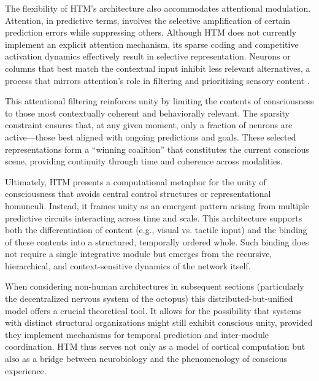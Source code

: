 \documentclass{article}
\begin{document}
The flexibility of HTM’s architecture also accommodates attentional modulation. Attention, in predictive terms, involves the selective amplification of certain prediction errors while suppressing others. Although HTM does not currently implement an explicit attention mechanism, its sparse coding and competitive activation dynamics effectively result in selective representation. Neurons or columns that best match the contextual input inhibit less relevant alternatives, a process that mirrors attention's role in filtering and prioritizing sensory content \parencite{cui2017spatial}.

This attentional filtering reinforces unity by limiting the contents of consciousness to those most contextually coherent and behaviorally relevant. The sparsity constraint ensures that, at any given moment, only a fraction of neurons are active—those best aligned with ongoing predictions and goals. These selected representations form a “winning coalition” that constitutes the current conscious scene, providing continuity through time and coherence across modalities.

Ultimately, HTM presents a computational metaphor for the unity of consciousness that avoids central control structures or representational homunculi. Instead, it frames unity as an emergent pattern arising from multiple predictive circuits interacting across time and scale. This architecture supports both the differentiation of content (e.g., visual vs. tactile input) and the binding of these contents into a structured, temporally ordered whole. Such binding does not require a single integrative module but emerges from the recursive, hierarchical, and context-sensitive dynamics of the network itself.

When considering non-human architectures in subsequent sections (particularly the decentralized nervous system of the octopus) this distributed-but-unified model offers a crucial theoretical tool. It allows for the possibility that systems with distinct structural organizations might still exhibit conscious unity, provided they implement mechanisms for temporal prediction and inter-module coordination. HTM thus serves not only as a model of cortical computation but also as a bridge between neurobiology and the phenomenology of conscious experience.



\newpage
\printbibliography
\end{document}
